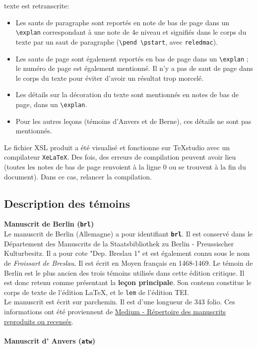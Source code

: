 \documentclass[12pt, a4paper]{article}
\begin{document}
\begin{itemize}
{            		texte est retranscrite:}
            		\begin{itemize}
            			\item{Les sauts de paragraphe sont reportés en note de 
            				bas de page dans un \texttt{\textbackslash explan} correspondant à une note de 4e niveau 
            				et signifiés dans le corps du texte par un saut de paragraphe 
            				(\texttt{\textbackslash pend \textbackslash pstart}, avec \texttt{reledmac}).} 
            			\item{Les sauts de page sont également reportés en bas de page dans un 
            				\texttt{\textbackslash explan} ; le numéro de page est également mentionné. Il n'y a 
            				pas de saut de page dans le corps du texte pour éviter d'avoir un résultat 
            				trop morcelé.}
            			\item{Les détails sur la décoration du texte sont mentionnés en notes de 
            				bas de page, dans un \texttt{\textbackslash explan}.}
            			\item{Pour les autres leçons (témoins d'Anvers et de Berne), ces 
            				détails ne sont pas mentionnés.}
            	\end{itemize}
            \end{itemize} 
            
            \indent Le fichier XSL produit a été visualisé et fonctionne sur TeXstudio 
            avec un compilateur \texttt{XeLaTeX}. Des fois, des erreurs de compilation 
            peuvent avoir lieu (toutes les notes de bas de page renvoient à la ligne 0 
            ou se trouvent à la fin du document). Dans ce cas, relancer la compilation.
        
                \subsection{Description des témoins}
                \noindent \textbf{Manuscrit de Berlin (\texttt{brl})}\\
            
         \indent Le manuscrit de Berlin (Allemagne) a pour identifiant \textbf{\texttt{brl}}. Il est conservé dans le Département des Manuscrits de la  Staatsbibliothek zu Berlin - Preussischer Kulturbesitz. Il a pour cote "Dep. Breslau 1" et est également connu sous le nom de \textit{Froissart de Breslau}. Il est écrit en Moyen français en 1468-1469. Le témoin de Berlin est le plus ancien des trois témoins utilisés dans cette édition critique. Il est donc retenu comme présentant la \textbf{leçon principale}.
                Son contenu constitue le corps de texte de l'édition \LaTeX, et
                le \texttt{lem} de l'édition TEI.\\ \indent Le manuscrit est écrit sur parchemin. Il est d'une longueur de 343 folio. Ces informations ont été proviennent de \href{http://medium-avance.irht.cnrs.fr/ark:/63955/md44pk02gf53}{Medium - Répertoire des manuscrits reproduits ou recensés}.\\~\\\noindent \textbf{Manuscrit d' Anvers (\texttt{atw})}\\
            
\end{document}

